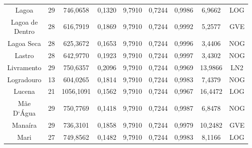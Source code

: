 \begin{table}[ht]
\begin{tabular}{ccccccccc}
Lagoa & 29 & 746,0658 & 0,1320 & 9,7910 & 0,7244 & 0,9986 & 6,9662 & LOG \\
Lagoa de Dentro & 28 & 616,7919 & 0,1869 & 9,7910 & 0,7244 & 0,9992 & 5,2577 & GVE \\
Lagoa Seca & 28 & 625,3672 & 0,1653 & 9,7910 & 0,7244 & 0,9996 & 3,4406 & NOG \\
Lastro & 28 & 642,9770 & 0,1923 & 9,7910 & 0,7244 & 0,9997 & 3,4302 & NOG \\
Livramento & 29 & 750,6357 & 0,2096 & 9,7910 & 0,7244 & 0,9969 & 13,9866 & LN2 \\
Logradouro & 13 & 604,0265 & 0,1814 & 9,7910 & 0,7244 & 0,9983 & 7,4379 & NOG \\
Lucena & 21 & 1056,1091 & 0,1562 & 9,7910 & 0,7244 & 0,9967 & 16,4472 & LOG \\
Mãe D`Água & 29 & 750,7769 & 0,1418 & 9,7910 & 0,7244 & 0,9987 & 6,8478 & NOG \\ 
Manaíra & 29 & 736,3101 & 0,1858 & 9,7910 & 0,7244 & 0,9979 & 10,2482 & GVE \\
Mari & 27 & 749,8562 & 0,1482 & 9,7910 & 0,7244 & 0,9983 & 8,1166 & LOG \\ \hline
\end{tabular}
\end{table}

\newpage


